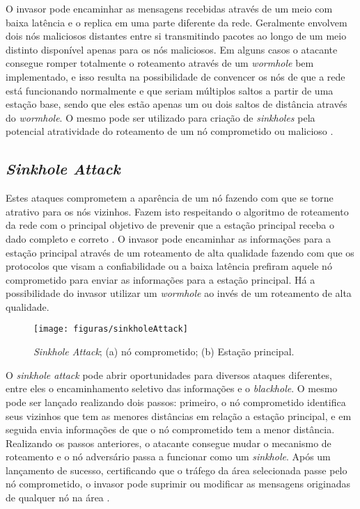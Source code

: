 \par O invasor pode encaminhar as mensagens recebidas através de um meio com baixa latência e o replica em uma parte diferente da rede. Geralmente envolvem dois n\'os maliciosos distantes entre si transmitindo pacotes ao longo de um meio distinto disponível apenas para os n\'os maliciosos. Em alguns casos o atacante consegue romper totalmente o roteamento através de um \emph{wormhole} bem implementado, e isso resulta na possibilidade de convencer os n\'os de que a rede está funcionando normalmente e que seriam múltiplos saltos a partir de uma estação base, sendo que eles estão apenas um ou dois saltos de distância através do \emph{wormhole}. O mesmo pode ser utilizado para criação de \emph{sinkholes} pela potencial atratividade do roteamento de um n\'o comprometido ou malicioso \cite{karlof2003}.

\subsection{\emph{Sinkhole Attack}}
\par Estes ataques comprometem a aparência de um n\'o fazendo com que se torne atrativo para os n\'os vizinhos. Fazem isto respeitando o algoritmo de roteamento da rede com o principal objetivo de prevenir que a estação principal receba o dado completo e correto \cite{ngai2006}. O invasor pode encaminhar as informações para a estação principal através de um roteamento de alta qualidade fazendo com que os protocolos que visam a confiabilidade ou a baixa latência prefiram aquele n\'o comprometido para enviar as informações para a estação principal. Há a possibilidade do invasor utilizar um \emph{wormhole} ao invés de um roteamento de alta qualidade. \cite{salehi2013}

\begin{figure}[ht]
	\caption{\emph{Sinkhole Attack}; (a) n\'o comprometido; (b) Estação principal.}
	\centering
		\texttt{[image: figuras/sinkholeAttack]}
\end{figure}

\par O \emph{sinkhole attack} pode abrir oportunidades para diversos ataques diferentes, entre eles o encaminhamento seletivo das informações e o \emph{blackhole}. O mesmo pode ser lançado realizando dois passos: primeiro, o n\'o comprometido identifica seus vizinhos que tem as menores distâncias em relação a estação principal, e em seguida envia informações de que o n\'o comprometido tem a menor distância. Realizando os passos anteriores, o atacante consegue mudar o mecanismo de roteamento e o n\'o adversário passa a funcionar como um \emph{sinkhole}. Após um lançamento de sucesso, certificando que o tráfego da área selecionada passe pelo n\'o comprometido, o invasor pode suprimir ou modificar as mensagens originadas de qualquer n\'o na área \cite{qi2012}.
